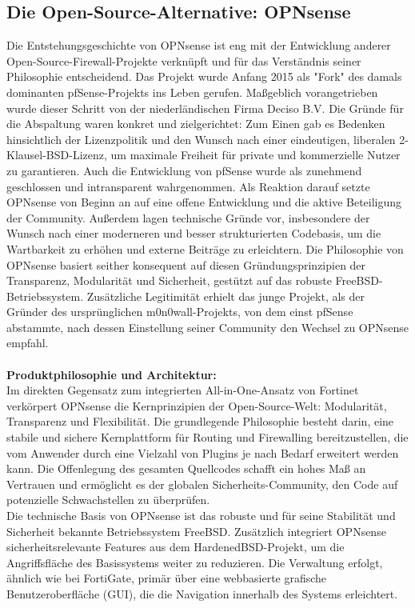 \subsection{Die Open-Source-Alternative: OPNsense}
Die Entstehungsgeschichte von OPNsense ist eng mit der Entwicklung anderer Open-Source-Firewall-Projekte verknüpft und für das Verständnis seiner Philosophie entscheidend. Das Projekt wurde Anfang 2015 als "Fork" des damals dominanten pfSense-Projekts ins Leben gerufen. Maßgeblich vorangetrieben wurde dieser Schritt von der niederländischen Firma Deciso B.V. Die Gründe für die Abspaltung waren konkret und zielgerichtet: Zum Einen gab es Bedenken hinsichtlich der Lizenzpolitik und den Wunsch nach einer eindeutigen, liberalen 2-Klausel-BSD-Lizenz, um maximale Freiheit für private und kommerzielle Nutzer zu garantieren. Auch die Entwicklung von pfSense wurde als zunehmend geschlossen und intransparent wahrgenommen. Als Reaktion darauf setzte OPNsense von Beginn an auf eine offene Entwicklung und die aktive Beteiligung der Community. Außerdem lagen technische Gründe vor, insbesondere der Wunsch nach einer moderneren und besser strukturierten Codebasis, um die Wartbarkeit zu erhöhen und externe Beiträge zu erleichtern. Die Philosophie von OPNsense basiert seither konsequent auf diesen Gründungsprinzipien der Transparenz, Modularität und Sicherheit, gestützt auf das robuste FreeBSD-Betriebssystem. Zusätzliche Legitimität erhielt das junge Projekt, als der Gründer des ursprünglichen m0n0wall-Projekts, von dem einst pfSense abstammte, nach dessen Einstellung seiner Community den Wechsel zu OPNsense empfahl.\cite{Fork}\\\\

\textbf{Produktphilosophie und Architektur:}\\
Im direkten Gegensatz zum integrierten All-in-One-Ansatz von Fortinet verkörpert OPNsense die Kernprinzipien der Open-Source-Welt: Modularität, Transparenz und Flexibilität. Die grundlegende Philosophie besteht darin, eine stabile und sichere Kernplattform für Routing und Firewalling bereitzustellen, die vom Anwender durch eine Vielzahl von Plugins je nach Bedarf erweitert werden kann. Die Offenlegung des gesamten Quellcodes schafft ein hohes Maß an Vertrauen und ermöglicht es der globalen Sicherheits-Community, den Code auf potenzielle Schwachstellen zu überprüfen.\cite{Fork}\\

Die technische Basis von OPNsense ist das robuste und für seine Stabilität und Sicherheit bekannte Betriebssystem FreeBSD. Zusätzlich integriert OPNsense sicherheitsrelevante Features aus dem HardenedBSD-Projekt, um die Angriffsfläche des Basissystems weiter zu reduzieren. Die Verwaltung erfolgt, ähnlich wie bei FortiGate, primär über eine webbasierte grafische Benutzeroberfläche (GUI), die die Navigation innerhalb des Systems erleichtert.\\


